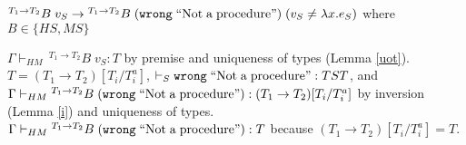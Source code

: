 \begin{case}
$^{T_{1}\rightarrow T_{2}}B\;v_{S}\rightarrow{^{T_{1}\rightarrow T_{2}}B}\;(\mathtt{wrong}\;\mathrm{``Not\;a\;procedure"})\;(v_{S}\neq\lambda x.e_{S})$ where $B\in\lbrace HS,MS\rbrace$

$\Gamma\vdash_{HM}\,^{T_{1}\rightarrow T_{2}}B\;v_{S}:T$ by premise and uniqueness of types (Lemma \ref{uot}).  $T=(T_{1}\rightarrow T_{2})[T_{i}/T_{i}^{a}]$, $\vdash_{S}\mathtt{wrong}\;\mathrm{``Not\;a\;procedure"}:TST$, and $\Gamma\vdash_{HM}{^{T_{1}\rightarrow T_{2}}B}\;(\mathtt{wrong}\;\mathrm{``Not\;a\;procedure"}):(T_{1}\rightarrow T_{2})[T_{i}/T_{i}^{a}]$ by inversion (Lemma \ref{i}) and uniqueness of types.  $\Gamma\vdash_{HM}{^{T_{1}\rightarrow T_{2}}B}\;(\mathtt{wrong}\;\mathrm{``Not\;a\;procedure"}):T$ because $(T_{1}\rightarrow T_{2})[T_{i}/T_{i}^{a}]=T$.
\end{case}